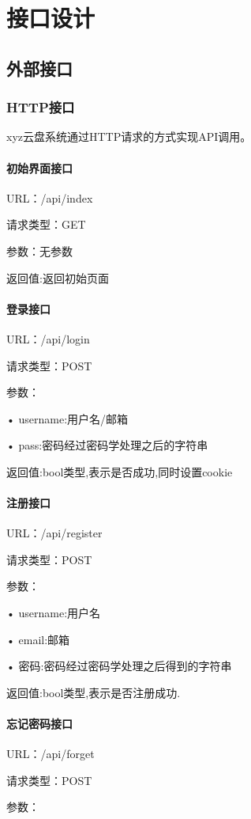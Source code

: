 \chapter{接口设计}
\section{外部接口}

\subsection{HTTP接口}
xyz云盘系统通过HTTP请求的方式实现API调用。

\subsubsection{初始界面接口}
URL：/api/index

请求类型：GET

参数：无参数
 
返回值:返回初始页面

\subsubsection{登录接口}
URL：/api/login

请求类型：POST

参数：

• username:用户名/邮箱

• pass:密码经过密码学处理之后的字符串
 
返回值:bool类型,表示是否成功,同时设置cookie

\subsubsection{注册接口}
URL：/api/register

请求类型：POST

参数：

• username:用户名

• email:邮箱

• 密码:密码经过密码学处理之后得到的字符串

返回值:bool类型,表示是否注册成功.

\subsubsection{忘记密码接口}
URL：/api/forget

请求类型：POST

参数：

